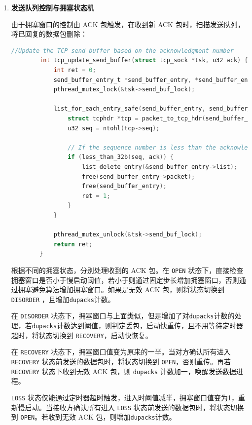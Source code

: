 \documentclass[UTF8]{report}
\newcommand{\tbf}[1]{\textbf{#1}}
\begin{document}
\begin{enumerate}
    \item \tbf{发送队列控制与拥塞状态机}
    
    由于拥塞窗口的控制由 ACK 包触发，在收到新 ACK 包时，扫描发送队列，将已回复的数据包删除：

    \begin{lstlisting}[language=C]
        //Update the TCP send buffer based on the acknowledgment number
        int tcp_update_send_buffer(struct tcp_sock *tsk, u32 ack) {
            int ret = 0;
            send_buffer_entry_t *send_buffer_entry, *send_buffer_entry_q;
            pthread_mutex_lock(&tsk->send_buf_lock);
        
            list_for_each_entry_safe(send_buffer_entry, send_buffer_entry_q, &tsk->send_buf, list) {
                struct tcphdr *tcp = packet_to_tcp_hdr(send_buffer_entry->packet);
                u32 seq = ntohl(tcp->seq);
        
                // If the sequence number is less than the acknowledgment number, delete the entry
                if (less_than_32b(seq, ack)) {
                    list_delete_entry(&send_buffer_entry->list);
                    free(send_buffer_entry->packet);
                    free(send_buffer_entry);
                    ret = 1;
                }
            }
        
            pthread_mutex_unlock(&tsk->send_buf_lock);
            return ret;
        }
    \end{lstlisting}

    根据不同的拥塞状态，分别处理收到的 ACK 包。在 \texttt{OPEN} 状态下，直接检查拥塞窗口是否小于慢启动阈值，若小于则通过固定步长增加拥塞窗口，否则通过拥塞避免算法增加拥塞窗口。如果是无效 ACK 包，则将状态切换到 \texttt{DISORDER} ，且增加\texttt{dupacks}计数。

    在 \texttt{DISORDER} 状态下，拥塞窗口与上面类似，但是增加了对\texttt{dupacks}计数的处理，若\texttt{dupacks}计数达到阈值，则判定丢包，启动快重传，且不用等待定时器超时，将状态切换到 \texttt{RECOVERY}，启动快恢复。

    在 \texttt{RECOVERY} 状态下，拥塞窗口值变为原来的一半。当对方确认所有进入 \texttt{RECOVERY} 状态前发送的数据包时，将状态切换到 \texttt{OPEN}，否则重传。再若 \texttt{RECOVERY} 状态下收到无效 ACK 包，则 \texttt{dupacks} 计数加一，唤醒发送数据进程。

    \texttt{LOSS} 状态仅能通过定时器超时触发，进入时阈值减半，拥塞窗口值变为1，重新慢启动。当接收方确认所有进入 \texttt{LOSS} 状态前发送的数据包时，将状态切换到 \texttt{OPEN}。若收到无效 ACK 包，则增加\texttt{dupacks}计数。


\end{enumerate}
\end{document}
